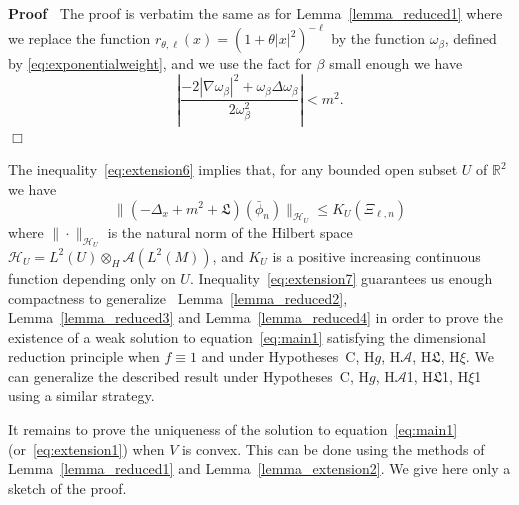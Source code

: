 \documentclass[a4paper,10pt]{article}
\newenvironment{proof}{\noindent\textbf{Proof\ }}{\hspace*{\fill}$\Box$\medskip}
\begin{document}
\begin{proof}
  The proof is verbatim the same as for Lemma~\ref{lemma_reduced1} where we
  replace the function $r_{\theta, \ell} (x) = (1 + \theta | x |^2)^{- \ell}$
  by the function $\omega_{\beta}$, defined by {\eqref{eq:exponentialweight}},
  and we use the fact for $\beta$ small enough we have
  \[ \left| \frac{- 2 | \nabla \omega_{\beta} |^2 + \omega_{\beta} \Delta
     \omega_{\beta}}{2 \omega_{\beta}^2} \right| < m^2 . \]
\end{proof}

The inequality~{\eqref{eq:extension6}} implies that, for any bounded open
subset $U$ of $\mathbb{R}^2$ we have
\begin{equation}
  \| (- \Delta_x + m^2 + \mathfrak{L}) (\bar{\phi}_n) \|_{\mathcal{H}_U}
  \leqslant K_U (\Xi_{\ell, n}) \label{eq:extension7}
\end{equation}
where $\| \cdot \|_{\mathcal{H}_U}$ is the natural norm of the Hilbert space
$\mathcal{H}_U = L^2 (U) \otimes_H \mathcal{A} (L^2 (M))$, and $K_U$ is a
positive increasing continuous function depending only on $U$.
Inequality~{\eqref{eq:extension7}} guarantees us enough compactness to
generalize \ Lemma~\ref{lemma_reduced2}, Lemma~\ref{lemma_reduced3} and
Lemma~\ref{lemma_reduced4} in order to prove the existence of a weak solution
to equation~{\eqref{eq:main1}} satisfying the dimensional reduction principle
when $f \equiv 1$ and under Hypotheses~C, H$g$, H$\mathcal{A}$,
H$\mathfrak{L}$, H$\xi$. We can generalize the described result under
Hypotheses~C, H$g$, H$\mathcal{A}$1, H$\mathfrak{L}$1, H$\xi$1 using a similar
strategy.

It remains to prove the uniqueness of the solution to
equation~{\eqref{eq:main1}} (or~{\eqref{eq:extension1}}) when $V$ is convex.
This can be done using the methods of Lemma~\ref{lemma_reduced1} and
Lemma~\ref{lemma_extension2}. We give here only a sketch of the proof.
\end{document}

